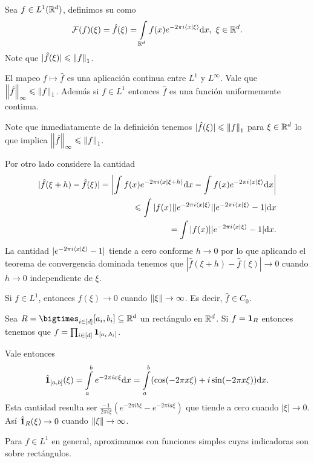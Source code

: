 \documentclass[12pt]{memoir}
\begin{document}
\begin{Def}
  Sea $f\in L^1(\mathbb{R}^d)$, definimos su  como
  $$\cF(f)(\xi)=\hat f(\xi)=\int\limits_{\bR^d}f(x)e^{-2\pi i\braket{x}{\xi}}\dd x,\ \xi\in\bR^d.$$
  Note que $|\hat{f}(\xi)|\leqslant \left\|f\right\|_1$.
\end{Def}

\begin{Th}
  El mapeo $f\mapsto\hat f$ es una aplicación continua entre $L^1$ y $L^\infty$.  Vale que $\left\|\hat f\right\|_\infty\leqslant\left\|f\right\|_1$. Además si $f\in L^1$ entonces $\hat f$ es una función uniformemente continua.
\end{Th}

\begin{ptcbp}
  Note que inmediatamente de la definición tenemos $|\hat{f}(\xi)|\leqslant\left\|f\right\|_1$ para $\xi\in\mathbb{R}^d$ lo que implica $\left\|\hat{f}\right\|_\infty\leqslant\left\|f\right\|_1$.\par
  Por otro lado considere la cantidad
  \begin{align*}
    |\hat{f}(\xi+h)-\hat{f}(\xi)|=\left|\int f(x)e^{-2\pi i\braket{x}{\xi+h}}\dd x-\int f(x)e^{-2\pi i\braket{x}{\xi}}\dd x\right|\\
  \leqslant \int|f(x)||e^{-2\pi i\braket{x}{\xi}}||e^{-2\pi i\braket{x}{\xi}}-1|\dd x\\
  =\int|f(x)||e^{-2\pi i\braket{x}{\xi}}-1|\dd x.
  \end{align*}
  La cantidad $|e^{-2\pi i\braket{x}{\xi}}-1|$ tiende a cero conforme $h\to 0$ por lo que aplicando el teorema de convergencia dominada tenemos que $|\hat{f}(\xi+h)-\hat{f}(\xi)|\to 0$ cuando $h\to 0$ independiente de $\xi$. 
\end{ptcbp}

\begin{Lem}\label{Lem:RiemannLebesgueLemma}
  Si $f\in L^1$, entonces $\hat{f}(\xi)\to 0$ cuando $\left\|\xi\right\|\to\infty$. Es decir, $\hat{f}\in C_0$.
\end{Lem}

\begin{ptcbp}
  Sea $R=\bigtimes_{i\in[d]}[a_i,b_i]\subseteq\bR^d$ un rectángulo en $\mathbb{R}^d$. Si $f=\mathbf{1}_R$ entonces tenemos que $f=\prod_{i\in[d]}\mathbf{1}_{[a_i,b_i]}$.\par
  Vale entonces 
  $$\hat{\mathbf{1}}_{[a,b]}(\xi)=\int\limits_a^be^{-2\pi ix\xi}\dd x=\int\limits_a^b(\cos(-2\pi x\xi)+i\sin(-2\pi x\xi))\dd x.$$
  Esta cantidad resulta ser $\frac{-1}{2\pi i\xi}(e^{-2\pi ib\xi}-e^{-2\pi ia\xi})$ que tiende a cero cuando $|\xi|\to 0$. Así $\hat{\mathbf{1}}_R(\xi)\to 0$ cuando $\left\|\xi\right\|\to\infty$.\par
  Para $f\in L^1$ en general, aproximamos con funciones simples cuyas indicadoras son sobre rectángulos.
\end{ptcbp}
\end{document}

